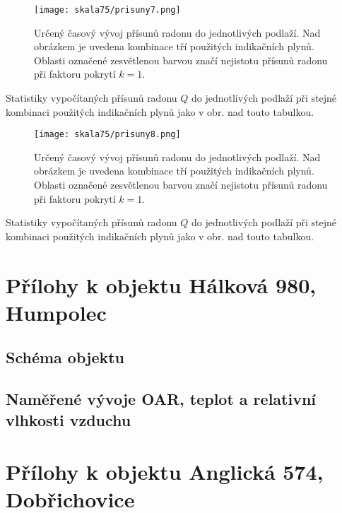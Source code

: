 \begin{figure}[H]
    \centering
    \texttt{[image: skala75/prisuny7.png]}
    \caption{Určený časový vývoj přísunů radonu do jednotlivých podlaží. Nad obrázkem je uvedena kombinace tří použitých indikačních plynů. Oblasti označené zesvětlenou barvou značí nejistotu přísunů radonu při faktoru pokrytí $k=1$.}
    \label{fig:skala75_prisuny7}
\end{figure}
\begin{table}[H]
    \centering
    \caption{Statistiky vypočítaných přísunů radonu $Q$ do jednotlivých podlaží při stejné kombinaci použitých indikačních plynů jako v obr. nad touto tabulkou.}
    \label{tab:skala75_prisuny7}
    
\end{table}

\begin{figure}[H]
    \centering
    \texttt{[image: skala75/prisuny8.png]}
    \caption{Určený časový vývoj přísunů radonu do jednotlivých podlaží. Nad obrázkem je uvedena kombinace tří použitých indikačních plynů. Oblasti označené zesvětlenou barvou značí nejistotu přísunů radonu při faktoru pokrytí $k=1$.}
    \label{fig:skala75_prisuny8}
\end{figure}
\begin{table}[H]
    \centering
    \caption{Statistiky vypočítaných přísunů radonu $Q$ do jednotlivých podlaží při stejné kombinaci použitých indikačních plynů jako v obr. nad touto tabulkou.}
    \label{tab:skala75_prisuny8}
    
\end{table}

\chapter{Přílohy k objektu Hálková 980, Humpolec}\label{navesti:priloha_humpolec980}

\section{Schéma objektu}

\section{Naměřené vývoje OAR, teplot a relativní vlhkosti vzduchu}


\chapter{Přílohy k objektu Anglická 574, Dobřichovice}\label{navesti:priloha_anglicka574}

